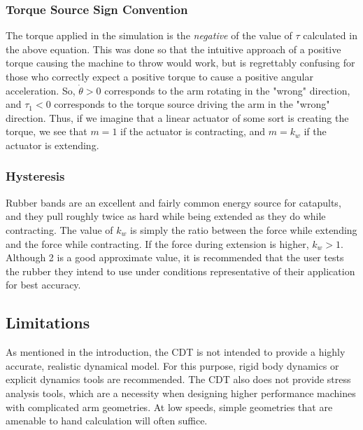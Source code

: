 \documentclass{article}
\begin{document}
\subsubsection{Torque Source Sign Convention}
The torque applied in the simulation is the \emph{negative} of the value of $\tau$ calculated in the above equation. %
This was done so that the intuitive approach of a positive torque causing the machine to throw would work, but is regrettably confusing for those who correctly expect a positive torque to cause a positive angular acceleration. So, $\dot{\theta} > 0$ corresponds to the arm rotating in the "wrong" direction, and $\tau_1 < 0$ corresponds to the torque source driving the arm in the "wrong" direction. Thus, if we imagine that a linear actuator of some sort is creating the torque, we see that $m=1$ if the actuator is contracting, and $m=k_w$ if the actuator is extending.

\subsubsection{Hysteresis}
Rubber bands are an excellent and fairly common energy source for catapults, and they pull roughly twice as hard while being extended as they do while contracting. The value of $k_w$ is simply the ratio between the force while extending and the force while contracting. If the force during extension is higher, $k_w > 1$. Although 2 is a good approximate value, it is recommended that the user tests the rubber they intend to use under conditions representative of their application for best accuracy.

\subsection{Limitations}
As mentioned in the introduction, the CDT is not intended to provide a highly accurate, realistic dynamical model. For this purpose, rigid body dynamics or explicit dynamics tools are recommended. The CDT also does not provide stress analysis tools, which are a necessity when designing higher performance machines with complicated arm geometries. At low speeds, simple geometries that are amenable to hand calculation will often suffice. 
\end{document}
